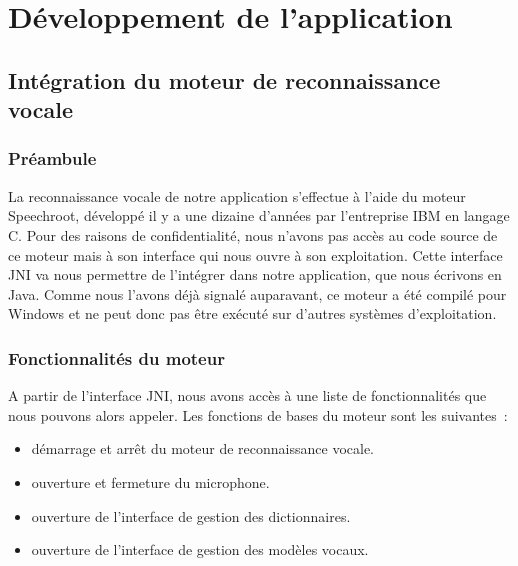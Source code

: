 \chapter{Développement de l'application}
\minitoc

\section{Intégration du moteur de reconnaissance vocale}

\subsection{Préambule}
La reconnaissance vocale de notre application s'effectue à l'aide du moteur Speechroot, développé il y a une dizaine d'années par l'entreprise IBM en langage C.
Pour des raisons de confidentialité, nous n'avons pas accès au code source de ce moteur mais à son interface qui nous ouvre à son exploitation.
Cette interface JNI va nous permettre de l'intégrer dans notre application, que nous écrivons en Java.
Comme nous l'avons déjà signalé auparavant, ce moteur a été compilé pour Windows et ne peut donc pas être exécuté sur d'autres systèmes d'exploitation.

\subsection{Fonctionnalités du moteur}
A partir de l'interface JNI, nous avons accès à une liste de fonctionnalités que nous pouvons alors appeler.
Les fonctions de bases du moteur sont les suivantes~:
\begin{itemize}
\item démarrage et arrêt du moteur de reconnaissance vocale.
\item ouverture et fermeture du microphone.
\item ouverture de l'interface de gestion des dictionnaires.
\item ouverture de l'interface de gestion des modèles vocaux.
\end{itemize}	

